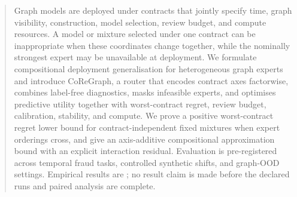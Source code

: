 \begin{abstract}
Graph models are deployed under contracts that jointly specify time, graph
visibility, construction, model selection, review budget, and compute
resources. A model or mixture selected under one contract can be inappropriate
when these coordinates change together, while the nominally strongest expert
may be unavailable at deployment. We formulate compositional deployment
generalisation for heterogeneous graph experts and introduce CoReGraph, a
router that encodes contract axes factorwise, combines label-free diagnostics,
masks infeasible experts, and optimises predictive utility together with
worst-contract regret, review budget, calibration, stability, and compute. We
prove a positive worst-contract regret lower bound for contract-independent
fixed mixtures when expert orderings cross, and give an axis-additive
compositional approximation bound with an explicit interaction residual.
Evaluation is pre-registered across temporal fraud tasks, controlled synthetic
shifts, and graph-OOD settings. Empirical results are \pending; no result claim
is made before the declared runs and paired analysis are complete.
\end{abstract}
